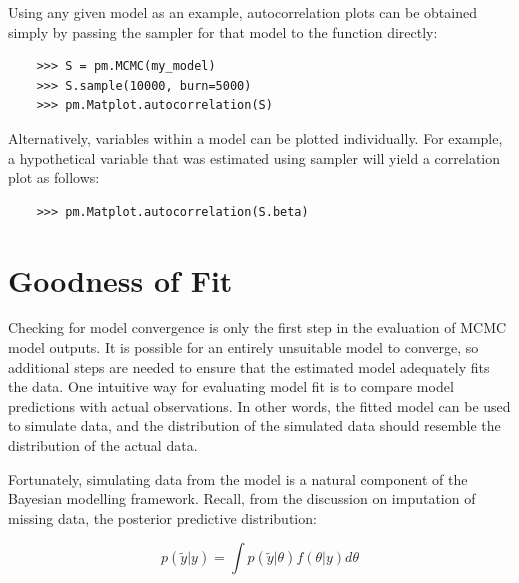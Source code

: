Using any given model  as an example, autocorrelation plots can be obtained simply by passing the sampler for that model to the  function directly:
\begin{verbatim}
	>>> S = pm.MCMC(my_model)
	>>> S.sample(10000, burn=5000)
	>>> pm.Matplot.autocorrelation(S)
\end{verbatim}
Alternatively, variables within a model can be plotted individually. For example, a hypothetical variable  that was estimated using sampler  will yield a correlation plot as follows:
\begin{verbatim}
	>>> pm.Matplot.autocorrelation(S.beta)
\end{verbatim}


\hypertarget{gof}{}
\section{Goodness of Fit} %

Checking for model convergence is only the first step in the evaluation of MCMC model outputs. It is possible for an entirely unsuitable model to converge, so additional steps are needed to ensure that the estimated model adequately fits the data. One intuitive way for evaluating model fit is to compare model predictions with actual observations. In other words, the fitted model can be used to simulate data, and the distribution of the simulated data should resemble the distribution of the actual data.

Fortunately, simulating data from the model is a natural component of the Bayesian modelling framework. Recall, from the discussion on imputation of missing data, the posterior predictive distribution:

\begin{equation}
	p(\tilde{y}|y) = \int p(\tilde{y}|\theta) f(\theta|y) d\theta
\end{equation}


